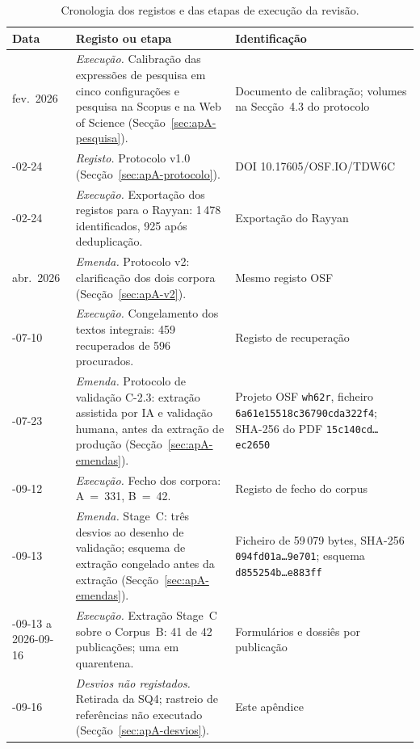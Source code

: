 \begin{table}[H]
\centering\small
\caption{Cronologia dos registos e das etapas de execução da revisão.}
\label{tab:apA-cronologia}
\begin{tabularx}{\linewidth}{@{}>{\raggedright\arraybackslash}p{2.1cm}>{\raggedright\arraybackslash}X>{\raggedright\arraybackslash}p{3.9cm}@{}}
\toprule
Data & Registo ou etapa & Identificação \\
\midrule
fev.\ 2026 & \emph{Execução.} Calibração das expressões de pesquisa em cinco configurações e pesquisa na Scopus e na Web of Science (Secção~\ref{sec:apA-pesquisa}). & Documento de calibração; volumes na Secção~4.3 do protocolo \\
2026-02-24 & \emph{Registo.} Protocolo v1.0 (Secção~\ref{sec:apA-protocolo}). & DOI 10.17605/OSF.IO/TDW6C \\
2026-02-24 & \emph{Execução.} Exportação dos registos para o Rayyan: 1\,478 identificados, 925 após deduplicação. & Exportação do Rayyan \\
abr.\ 2026 & \emph{Emenda.} Protocolo v2: clarificação dos dois corpora (Secção~\ref{sec:apA-v2}). & Mesmo registo OSF \\
2026-07-10 & \emph{Execução.} Congelamento dos textos integrais: 459 recuperados de 596 procurados. & Registo de recuperação \\
2026-07-23 & \emph{Emenda.} Protocolo de validação C-2.3: extração assistida por IA e validação humana, antes da extração de produção (Secção~\ref{sec:apA-emendas}). & Projeto OSF \texttt{wh62r}, ficheiro \texttt{6a61e155\allowbreak 18c36790\allowbreak cda322f4}; SHA-256 do PDF \texttt{15c140cd\ldots ec2650} \\
2026-09-12 & \emph{Execução.} Fecho dos corpora: A~=~331, B~=~42. & Registo de fecho do corpus \\
2026-09-13 & \emph{Emenda.} Stage~C: três desvios ao desenho de validação; esquema de extração congelado antes da extração (Secção~\ref{sec:apA-emendas}). & Ficheiro de 59\,079 bytes, SHA-256 \texttt{094fd01a\ldots 9e701}; esquema \texttt{d855254b\ldots e883ff} \\
2026-09-13 a 2026-09-16 & \emph{Execução.} Extração Stage~C sobre o Corpus~B: 41 de 42 publicações; uma em quarentena. & Formulários e dossiês por publicação \\
2026-09-16 & \emph{Desvios não registados.} Retirada da SQ4; rastreio de referências não executado (Secção~\ref{sec:apA-desvios}). & Este apêndice \\
\bottomrule
\end{tabularx}
\end{table}

